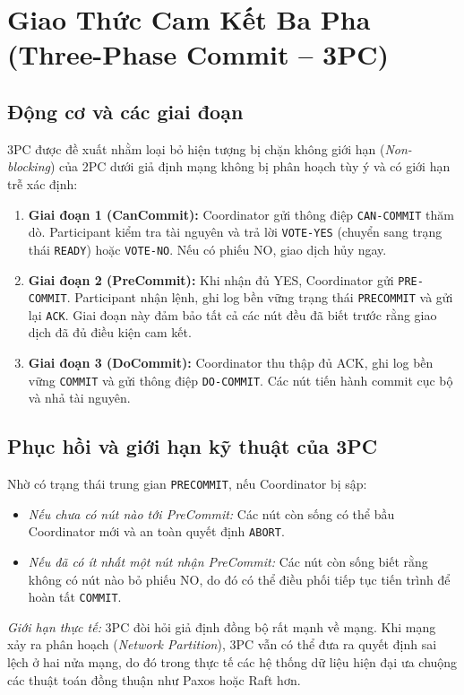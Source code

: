 \documentclass[12pt,a4paper]{report}
\begin{document}
\section{Giao Thức Cam Kết Ba Pha (Three-Phase Commit -- 3PC)}

\subsection{Động cơ và các giai đoạn}
3PC được đề xuất nhằm loại bỏ hiện tượng bị chặn không giới hạn (\textit{Non-blocking}) của 2PC dưới giả định mạng không bị phân hoạch tùy ý và có giới hạn trễ xác định:
\begin{enumerate}[leftmargin=0.8cm, topsep=1pt, itemsep=1pt]
    \item \textbf{Giai đoạn 1 (CanCommit):} Coordinator gửi thông điệp \texttt{CAN-COMMIT} thăm dò. Participant kiểm tra tài nguyên và trả lời \texttt{VOTE-YES} (chuyển sang trạng thái \texttt{READY}) hoặc \texttt{VOTE-NO}. Nếu có phiếu NO, giao dịch hủy ngay.
    \item \textbf{Giai đoạn 2 (PreCommit):} Khi nhận đủ YES, Coordinator gửi \texttt{PRE-COMMIT}. Participant nhận lệnh, ghi log bền vững trạng thái \texttt{PRECOMMIT} và gửi lại \texttt{ACK}. Giai đoạn này đảm bảo tất cả các nút đều đã biết trước rằng giao dịch đã đủ điều kiện cam kết.
    \item \textbf{Giai đoạn 3 (DoCommit):} Coordinator thu thập đủ ACK, ghi log bền vững \texttt{COMMIT} và gửi thông điệp \texttt{DO-COMMIT}. Các nút tiến hành commit cục bộ và nhả tài nguyên.
\end{enumerate}

\subsection{Phục hồi và giới hạn kỹ thuật của 3PC}
Nhờ có trạng thái trung gian \texttt{PRECOMMIT}, nếu Coordinator bị sập:
\begin{itemize}[leftmargin=0.8cm, topsep=1pt, itemsep=1pt]
    \item \textit{Nếu chưa có nút nào tới PreCommit:} Các nút còn sống có thể bầu Coordinator mới và an toàn quyết định \texttt{ABORT}.
    \item \textit{Nếu đã có ít nhất một nút nhận PreCommit:} Các nút còn sống biết rằng không có nút nào bỏ phiếu NO, do đó có thể điều phối tiếp tục tiến trình để hoàn tất \texttt{COMMIT}.
\end{itemize}
\textit{Giới hạn thực tế:} 3PC đòi hỏi giả định đồng bộ rất mạnh về mạng. Khi mạng xảy ra phân hoạch (\textit{Network Partition}), 3PC vẫn có thể đưa ra quyết định sai lệch ở hai nửa mạng, do đó trong thực tế các hệ thống dữ liệu hiện đại ưa chuộng các thuật toán đồng thuận như Paxos hoặc Raft hơn.
\end{document}
